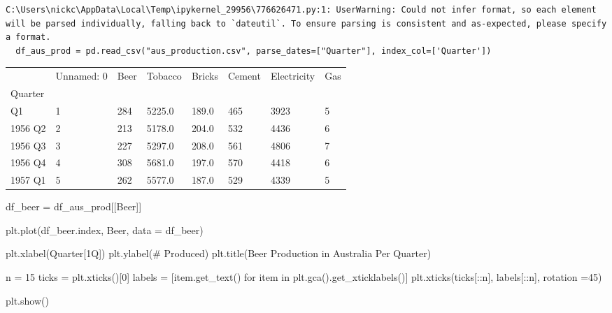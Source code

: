 \documentclass[
  11pt,
]{article}
\newenvironment{Shaded}{\begin{snugshade}}{\end{snugshade}}
\newcommand{\ControlFlowTok}[1]{\textcolor[rgb]{0.00,0.23,0.31}{#1}}
\newcommand{\DecValTok}[1]{\textcolor[rgb]{0.68,0.00,0.00}{#1}}
\newcommand{\KeywordTok}[1]{\textcolor[rgb]{0.00,0.23,0.31}{#1}}
\newcommand{\NormalTok}[1]{\textcolor[rgb]{0.00,0.23,0.31}{#1}}
\newcommand{\OperatorTok}[1]{\textcolor[rgb]{0.37,0.37,0.37}{#1}}
\newcommand{\StringTok}[1]{\textcolor[rgb]{0.13,0.47,0.30}{#1}}
\begin{document}
\begin{verbatim}
C:\Users\nickc\AppData\Local\Temp\ipykernel_29956\776626471.py:1: UserWarning: Could not infer format, so each element will be parsed individually, falling back to `dateutil`. To ensure parsing is consistent and as-expected, please specify a format.
  df_aus_prod = pd.read_csv("aus_production.csv", parse_dates=["Quarter"], index_col=['Quarter'])
\end{verbatim}

\begin{longtable}[]{@{}llllllll@{}}
\toprule\noalign{}
& Unnamed: 0 & Beer & Tobacco & Bricks & Cement & Electricity & Gas \\
Quarter & & & & & & & \\
\midrule\noalign{}
\endhead
\bottomrule\noalign{}
\endlastfoot
1956 Q1 & 1 & 284 & 5225.0 & 189.0 & 465 & 3923 & 5 \\
1956 Q2 & 2 & 213 & 5178.0 & 204.0 & 532 & 4436 & 6 \\
1956 Q3 & 3 & 227 & 5297.0 & 208.0 & 561 & 4806 & 7 \\
1956 Q4 & 4 & 308 & 5681.0 & 197.0 & 570 & 4418 & 6 \\
1957 Q1 & 5 & 262 & 5577.0 & 187.0 & 529 & 4339 & 5 \\
\end{longtable}

\begin{Shaded}
\begin{Highlighting}[]
\NormalTok{df\_beer }\OperatorTok{=}\NormalTok{ df\_aus\_prod[[}\StringTok{\textquotesingle{}Beer\textquotesingle{}}\NormalTok{]]}

\NormalTok{plt.plot(df\_beer.index, }\StringTok{\textquotesingle{}Beer\textquotesingle{}}\NormalTok{, data }\OperatorTok{=}\NormalTok{ df\_beer)}

\NormalTok{plt.xlabel(}\StringTok{\textquotesingle{}Quarter[1Q]\textquotesingle{}}\NormalTok{)}
\NormalTok{plt.ylabel(}\StringTok{\textquotesingle{}\# Produced\textquotesingle{}}\NormalTok{)}
\NormalTok{plt.title(}\StringTok{\textquotesingle{}Beer Production in Australia Per Quarter\textquotesingle{}}\NormalTok{)}

\NormalTok{n }\OperatorTok{=} \DecValTok{15}
\NormalTok{ticks }\OperatorTok{=}\NormalTok{ plt.xticks()[}\DecValTok{0}\NormalTok{]}
\NormalTok{labels }\OperatorTok{=}\NormalTok{ [item.get\_text() }\ControlFlowTok{for}\NormalTok{ item }\KeywordTok{in}\NormalTok{ plt.gca().get\_xticklabels()]}
\NormalTok{plt.xticks(ticks[::n], labels[::n], rotation }\OperatorTok{=}\DecValTok{45}\NormalTok{)}

\NormalTok{plt.show()}
\end{Highlighting}
\end{Shaded}
\end{document}
